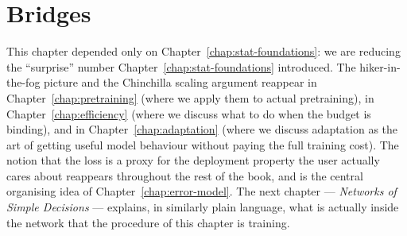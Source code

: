 \section*{Bridges}

This chapter depended only on Chapter~\ref{chap:stat-foundations}: we are reducing the
``surprise'' number Chapter~\ref{chap:stat-foundations} introduced. The hiker-in-the-fog
picture and the Chinchilla scaling argument reappear in
Chapter~\ref{chap:pretraining} (where we apply them to actual pretraining), in
Chapter~\ref{chap:efficiency} (where we discuss what to do when the budget is
binding), and in Chapter~\ref{chap:adaptation} (where we discuss adaptation as the
art of getting useful model behaviour without paying the full
training cost). The notion that the loss is a proxy for the
deployment property the user actually cares about reappears
throughout the rest of the book, and is the central organising
idea of Chapter~\ref{chap:error-model}. The next chapter --- \emph{Networks of
Simple Decisions} --- explains, in similarly plain language,
what is actually inside the network that the procedure of this
chapter is training.
